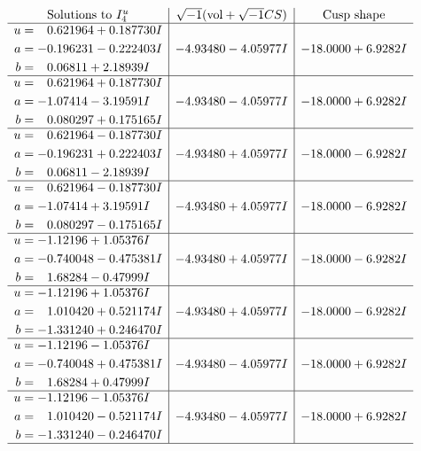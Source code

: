\documentclass[1p]{elsarticle_modified}
\theoremstyle{definition}
\newcommand{\I}{\sqrt{-1}}
\begin{document}
$$\begin{array}{c|c|c}  
\text{Solutions to }I^u_{4}& \I (\text{vol} + \sqrt{-1}CS) & \text{Cusp shape}\\
 \hline 
\begin{aligned}
u &= \phantom{-}0.621964 + 0.187730 I \\
a &= -0.196231 - 0.222403 I \\
b &= \phantom{-}0.06811 + 2.18939 I\end{aligned}
 & -4.93480 - 4.05977 I & -18.0000 + 6.9282 I \\ \hline\begin{aligned}
u &= \phantom{-}0.621964 + 0.187730 I \\
a &= -1.07414 - 3.19591 I \\
b &= \phantom{-}0.080297 + 0.175165 I\end{aligned}
 & -4.93480 - 4.05977 I & -18.0000 + 6.9282 I \\ \hline\begin{aligned}
u &= \phantom{-}0.621964 - 0.187730 I \\
a &= -0.196231 + 0.222403 I \\
b &= \phantom{-}0.06811 - 2.18939 I\end{aligned}
 & -4.93480 + 4.05977 I & -18.0000 - 6.9282 I \\ \hline\begin{aligned}
u &= \phantom{-}0.621964 - 0.187730 I \\
a &= -1.07414 + 3.19591 I \\
b &= \phantom{-}0.080297 - 0.175165 I\end{aligned}
 & -4.93480 + 4.05977 I & -18.0000 - 6.9282 I \\ \hline\begin{aligned}
u &= -1.12196 + 1.05376 I \\
a &= -0.740048 - 0.475381 I \\
b &= \phantom{-}1.68284 - 0.47999 I\end{aligned}
 & -4.93480 + 4.05977 I & -18.0000 - 6.9282 I \\ \hline\begin{aligned}
u &= -1.12196 + 1.05376 I \\
a &= \phantom{-}1.010420 + 0.521174 I \\
b &= -1.331240 + 0.246470 I\end{aligned}
 & -4.93480 + 4.05977 I & -18.0000 - 6.9282 I \\ \hline\begin{aligned}
u &= -1.12196 - 1.05376 I \\
a &= -0.740048 + 0.475381 I \\
b &= \phantom{-}1.68284 + 0.47999 I\end{aligned}
 & -4.93480 - 4.05977 I & -18.0000 + 6.9282 I \\ \hline\begin{aligned}
u &= -1.12196 - 1.05376 I \\
a &= \phantom{-}1.010420 - 0.521174 I \\
b &= -1.331240 - 0.246470 I\end{aligned}
 & -4.93480 - 4.05977 I & -18.0000 + 6.9282 I\\
 \hline 
 \end{array}$$\newpage\newpage\renewcommand{\arraystretch}{1}
\end{document}
